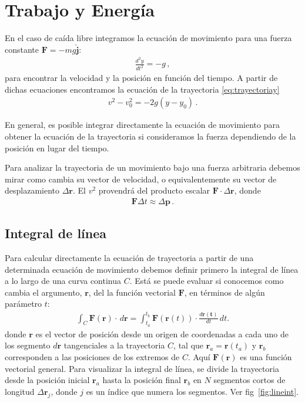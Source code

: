 
\chapter{Trabajo y Energía}
\label{chap:energia}

En el caso de caída libre integramos la ecuación de movimiento para una fuerza constante $\mathbf{F}=-m g\hat{\mathbf{j}}$:
\begin{align}
  \frac{d^2y}{dt^2}=-g\,,
\end{align}
para encontrar la velocidad y la posición en función del tiempo. A partir de dichas ecuaciones encontramos la ecuación de la trayectoria \eqref{eq:trayectoriay}
\begin{align}
\label{eq:trayl}
  v^2-v_0^2=-2g(y-y_0)\,.
\end{align}

En general, es posible integrar directamente la ecuación de movimiento para obtener la ecuación de la trayectoria si consideramos la fuerza dependiendo de la posición en lugar del tiempo.

Para analizar la trayectoria de un movimiento bajo una fuerza arbitraria debemos mirar como cambia su vector de velocidad, o equivalentemente su vector de desplazamiento $\Delta\mathbf{r}$. El $v^2$ provendrá del producto escalar $\mathbf{F}\cdot \Delta\mathbf{r}$, donde
\begin{align}
  \mathbf{F}\Delta t\approx \Delta\mathbf{p}\,.
\end{align}


\section{Integral de línea}
Para calcular directamente la ecuación de trayectoria a partir de una determinada ecuación de movimiento debemos definir primero la integral de línea a lo largo de una curva continua $C$. Está se puede evaluar si conocemos como cambia el argumento, $\mathbf{r}$, del la función vectorial $\mathbf{F}$, en términos de algún parámetro $t$:
\begin{align}
  \label{eq:e12}
  \int_C \mathbf{F}(\mathbf{r})\cdot\,d\mathbf{r} = \int_{t_a}^{t_b} \mathbf{F}(\mathbf{r}(t))\cdot\frac{d\mathbf{r(t)}}{dt}\,dt.
\end{align}
donde $\mathbf{r}$ es el vector de posición desde un origen de coordenadas a cada uno de los segmento $d\mathbf{r}$ tangenciales a la trayectoria $C$, tal que $\mathbf{r}_a=\mathbf{r}(t_a)$ y $\mathbf{r}_b$ corresponden a las posiciones de los extremos de $C$. Aquí $\mathbf{F}(\mathbf{r})$ es una función vectorial general. Para visualizar la integral de línea, se divide la trayectoria desde la posición inicial $\mathbf{r}_a$ hasta la posición final $\mathbf{r}_b$ en $N$ segmentos cortos de longitud $\Delta \mathbf{r}_j$, donde $j$ es un índice que numera los segmentos.  Ver fig~\ref{fig:lineint}.


